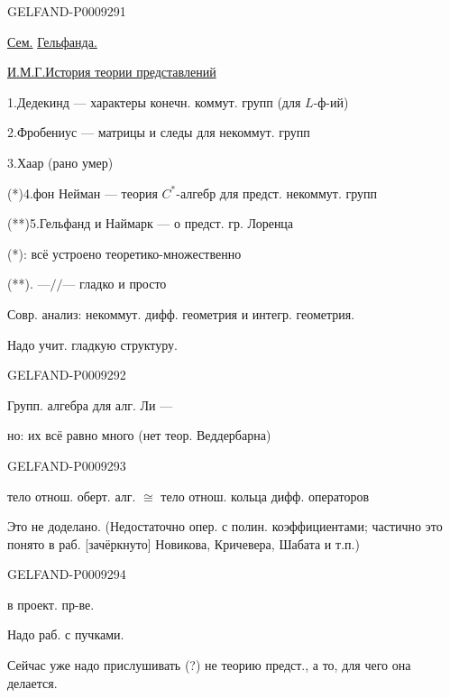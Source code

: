 \begin{GelfandAdjacentEvidence}{GELFAND-P000929}{1}

\qquad \underline{Сем.} \underline{Гельфанда.}

\underline{И.М.Г.}\qquad \underline{История теории представлений}

1.\enspace Дедекинд --- характеры конечн. коммут. групп (для $L$-ф-ий)

2.\enspace Фробениус --- матрицы и следы для некоммут. групп

3.\enspace Хаар (рано умер)

(*)4.\enspace фон Нейман --- теория $C^*$-алгебр для предст. некоммут. групп

(**)5.\enspace Гельфанд и Наймарк --- о предст. гр. Лоренца

 (*): всё устроено теоретико-множественно

\hspace{2em}(**). ---\(//\)--- гладко и просто

Совр. анализ: некоммут. дифф. геометрия и интегр. геометрия.

{\small Надо учит. гладкую структуру.}
\end{GelfandAdjacentEvidence}
\begin{GelfandAdjacentEvidence}{GELFAND-P000929}{2}


Групп. алгебра для алг. Ли --- 

но: их всё равно много (нет теор. Веддербарна)
\end{GelfandAdjacentEvidence}
\begin{GelfandAdjacentEvidence}{GELFAND-P000929}{3}


\enspace тело отнош. оберт. алг. \(\cong\) тело отнош. кольца дифф. операторов

Это не доделано. (Недостаточно опер. с полин. коэффициентами; частично это понято в раб. [зачёркнуто] Новикова, Кричевера, Шабата и т.п.)
\end{GelfandAdjacentEvidence}
\begin{GelfandAdjacentEvidence}{GELFAND-P000929}{4}


\qquad в проект. пр-ве.

Надо раб. с пучками.

Сейчас уже надо прислушивать (?) не теорию предст., а то, для чего она делается.
\end{GelfandAdjacentEvidence}



